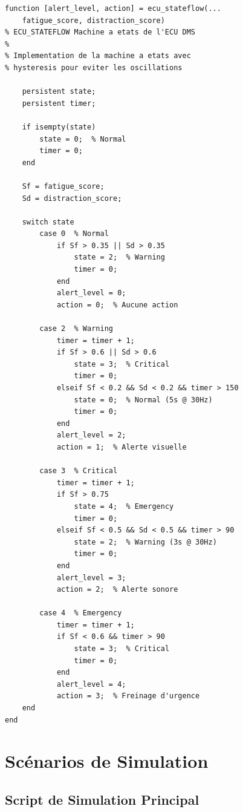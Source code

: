 \documentclass[12pt,a4paper,twoside]{report}
\begin{document}
\begin{lstlisting}[style=matlabstyle, caption={Logique de la machine à états ECU en MATLAB.}, label={lst:stateflow_matlab}]
function [alert_level, action] = ecu_stateflow(...
    fatigue_score, distraction_score)
% ECU_STATEFLOW Machine a etats de l'ECU DMS
%
% Implementation de la machine a etats avec
% hysteresis pour eviter les oscillations

    persistent state;
    persistent timer;
    
    if isempty(state)
        state = 0;  % Normal
        timer = 0;
    end
    
    Sf = fatigue_score;
    Sd = distraction_score;
    
    switch state
        case 0  % Normal
            if Sf > 0.35 || Sd > 0.35
                state = 2;  % Warning
                timer = 0;
            end
            alert_level = 0;
            action = 0;  % Aucune action
            
        case 2  % Warning
            timer = timer + 1;
            if Sf > 0.6 || Sd > 0.6
                state = 3;  % Critical
                timer = 0;
            elseif Sf < 0.2 && Sd < 0.2 && timer > 150
                state = 0;  % Normal (5s @ 30Hz)
                timer = 0;
            end
            alert_level = 2;
            action = 1;  % Alerte visuelle
            
        case 3  % Critical
            timer = timer + 1;
            if Sf > 0.75
                state = 4;  % Emergency
                timer = 0;
            elseif Sf < 0.5 && Sd < 0.5 && timer > 90
                state = 2;  % Warning (3s @ 30Hz)
                timer = 0;
            end
            alert_level = 3;
            action = 2;  % Alerte sonore
            
        case 4  % Emergency
            timer = timer + 1;
            if Sf < 0.6 && timer > 90
                state = 3;  % Critical
                timer = 0;
            end
            alert_level = 4;
            action = 3;  % Freinage d'urgence
    end
end
\end{lstlisting}

\section{Scénarios de Simulation}

\subsection{Script de Simulation Principal}
\end{document}
